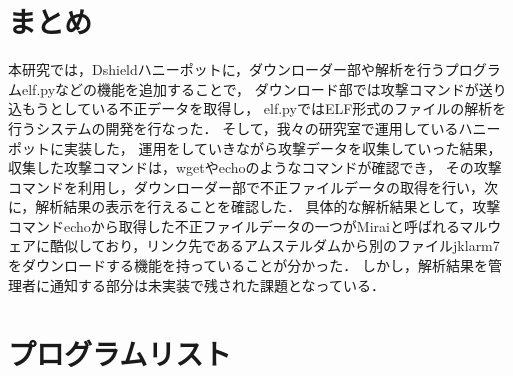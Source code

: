 \documentclass[dvipdfmx]{bta}
\begin{document}

\chapter{まとめ}

本研究では，Dshieldハニーポットに，ダウンローダー部や解析を行うプログラムelf.pyなどの機能を追加することで，
ダウンロード部では攻撃コマンドが送り込もうとしている不正データを取得し，
elf.pyではELF形式のファイルの解析を行うシステムの開発を行なった．
そして，我々の研究室で運用しているハニーポットに実装した，
運用をしていきながら攻撃データを収集していった結果，
収集した攻撃コマンドは，wgetやechoのようなコマンドが確認でき，
その攻撃コマンドを利用し，ダウンローダー部で不正ファイルデータの取得を行い，次に，解析結果の表示を行えることを確認した．
具体的な解析結果として，攻撃コマンドechoから取得した不正ファイルデータの一つがMiraiと呼ばれるマルウェアに酷似しており，リンク先であるアムステルダムから別のファイルjklarm7をダウンロードする機能を持っていることが分かった．
しかし，解析結果を管理者に通知する部分は未実装で残された課題となっている．

%



\appendix

\chapter{プログラムリスト}


\end{document}
